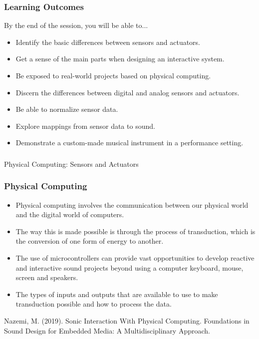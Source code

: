 \documentclass[screen, aspectratio=169]{beamer}
\begin{document}
%
\begin{frame}
\frametitle{Learning Outcomes}
By the end of the session,  you will be able to...
\begin{itemize}
\item Identify the basic differences between sensors and actuators.
\item Get a sense of the main parts when designing an interactive system.
\item Be exposed to real-world projects based on physical computing.
\item Discern the differences between digital and analog sensors and actuators.
\item Be able to normalize sensor data.
\item Explore mappings from sensor data to sound.
\item Demonstrate a custom-made musical instrument in a performance setting.
\end{itemize}
\end{frame}
%
\usebackgroundtemplate{}
\begin{frame}
\frametitle{}
{\huge Physical Computing: Sensors and Actuators}
\end{frame}
%
\begin{frame}
\frametitle{Physical Computing}
\begin{itemize}
\item Physical computing involves the communication between our physical world and the digital world of computers.
\item The way this is made possible is through the process of transduction, which is the conversion of one form of energy to another.
\item The use of microcontrollers can provide vast opportunities to develop reactive and interactive sound projects beyond using a computer keyboard, mouse, screen and speakers.
\item The types of inputs and outputs that are available to use to make transduction possible and how to process the data.
\end{itemize}
{\tiny
Nazemi, M. (2019). Sonic Interaction With Physical Computing. Foundations in Sound Design for Embedded Media: A Multidisciplinary Approach. \cite{Nazemi.2019.SID}
}	
\end{frame}
%
\end{document}
